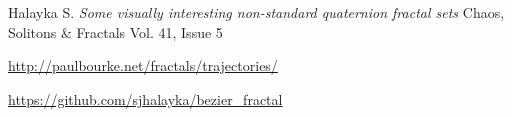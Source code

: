\documentclass[12pt]{article}
\begin{document}

 

\pagebreak

\begin{thebibliography}{9}

 Halayka S. \emph{Some visually interesting non-standard quaternion fractal sets} Chaos, Solitons \& Fractals Vol. 41, Issue 5		

 \url{http://paulbourke.net/fractals/trajectories/}

 \url{https://github.com/sjhalayka/bezier_fractal}

\end{thebibliography}
\end{document}
